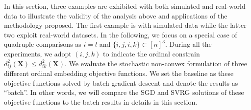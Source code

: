 \documentclass[letterpaper]{article}
\begin{document}
		In this section, three examples are exhibited with both simulated and real-world data to illustrate the validity of the analysis above and applications of the methodology proposed. The first example is with simulated data while the latter two exploit real-world datasets. In the following, we focus on a special case of quadruple comparisons as $i=l$ and $\{i,j,i,k\}\subset[n]^3$. During all the experiments, we adopt $(i,j,k)$ to indicate the ordinal constrain $d^2_{ij}(\mathbf{X})\leq d^2_{ik}(\mathbf{X})$. We evaluate the stochastic non-convex formulation of three different ordinal embedding objective functions. We set the baseline as these objective functions solved by batch gradient descent and denote the results as ``batch''. In other words, we will compare the SGD and SVRG solutions of these objective functions to the batch results in details in this section.
		
\end{document}
